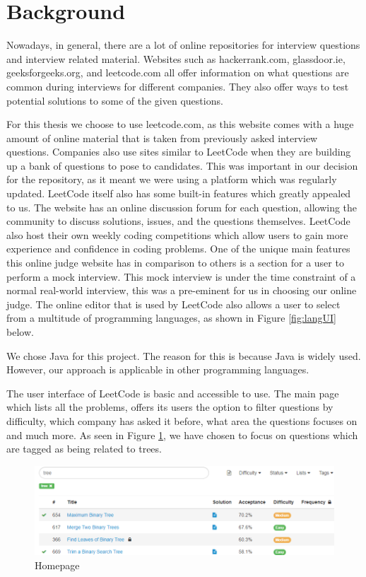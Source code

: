 \documentclass[10pt,twocolumn,hidelinks]{IEEEtran}
\begin{document}
\section{Background}
\par Nowadays, in general, there are a lot of online repositories for interview questions and interview related material. Websites such as hackerrank.com, glassdoor.ie, geeksforgeeks.org, and leetcode.com all offer information on what questions are common during interviews for different companies. They also offer ways to test potential solutions to some of the given questions. 
\par For this thesis we choose to use leetcode.com\cite{leet1}, as this website comes with a huge amount of online material that is taken from previously asked interview questions. Companies also use sites similar to LeetCode when they are building up a bank of questions to pose to candidates. This was important in our decision for the repository, as it meant we were using a platform which was regularly updated. LeetCode itself also has some built-in features which greatly appealed to us. The website has an online discussion forum for each question, allowing the community to discuss solutions, issues, and the questions themselves. LeetCode also host their own weekly coding competitions which allow users to gain more experience and confidence in coding problems. One of the unique main features this online judge website has in comparison to others is a section for a user to perform a mock interview. This mock interview is under the time constraint of a normal real-world interview, this was a pre-eminent for us in choosing our online judge. The online editor that is used by LeetCode also allows a user to select from a multitude of programming languages, as shown in Figure \ref{fig:langUI} below.
\par We chose Java for this project. The reason for this is because Java is widely used. However, our approach is applicable in other programming languages.  
\par The user interface of LeetCode is basic and accessible to use. The main page which lists all the problems, offers its users the option to filter questions by difficulty, which company has asked it before, what area the questions focuses on and much more. As seen in Figure \ref{fig:homepage}, we have chosen to focus on questions which are tagged as being related to trees. 
\begin{figure}[h]
\includegraphics[scale=0.4]{homepageUI.png}
\caption{Homepage}
\label{fig:homepage}
\end{figure}
\end{document}
